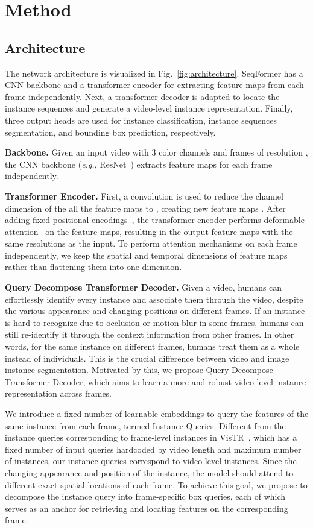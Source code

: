 \documentclass[runningheads]{llncs}
\begin{document}
\section{Method}

\subsection{Architecture}
The network architecture is visualized in Fig.~\ref{fig:architecture}. SeqFormer has a CNN backbone and a transformer encoder for extracting feature maps from each frame independently. 
Next, a transformer decoder is adapted to locate the instance sequences and generate a video-level instance representation.
Finally, three output heads are used for instance classification, instance sequences segmentation, and bounding box prediction, respectively.
 
\noindent\textbf{Backbone.}
Given an input video  with 3 color channels and  frames of resolution , the CNN backbone (\emph{e.g.}, ResNet~\cite{resnet}) extracts feature maps for each frame independently. 


\noindent\textbf{Transformer Encoder.}
First, a  convolution is used to reduce the channel dimension of the all the feature maps to , creating new feature maps . After adding fixed positional encodings~\cite{detr}, the transformer encoder performs deformable attention~\cite{deformableDETR} on the feature maps, resulting in the output feature maps  with the same resolutions as the input. 
To perform attention mechanisms on each frame independently, we keep the spatial and temporal dimensions of feature maps rather than flattening them into one dimension.


\noindent\textbf{Query Decompose Transformer Decoder.}
Given a video, humans can effortlessly identify every instance and associate them through the video, despite the various appearance and changing positions on different frames. If an instance is hard to recognize due to occlusion or motion blur in some frames, humans can still re-identify it through the context information from other frames. In other words, for the same instance on different frames, humans treat them as a whole instead of individuals. This is the crucial difference between video and image instance segmentation. Motivated by this, we propose Query Decompose Transformer Decoder, which aims to learn a  more and robust video-level instance representation across frames.

We introduce a fixed number of learnable embeddings to query the features of the same instance from each frame, termed Instance Queries. Different from the instance queries corresponding to frame-level instances in VisTR~\cite{VisTR}, 
which has a fixed number of input queries hardcoded by video length and maximum number of instances, our instance queries correspond to video-level instances. Since the changing appearance and position of the instance, the model should attend to different exact spatial locations of each frame. 
To achieve this goal, we propose to decompose the instance query into  frame-specific box queries, each of which serves as an anchor for retrieving and locating features on the corresponding frame.
\end{document}
